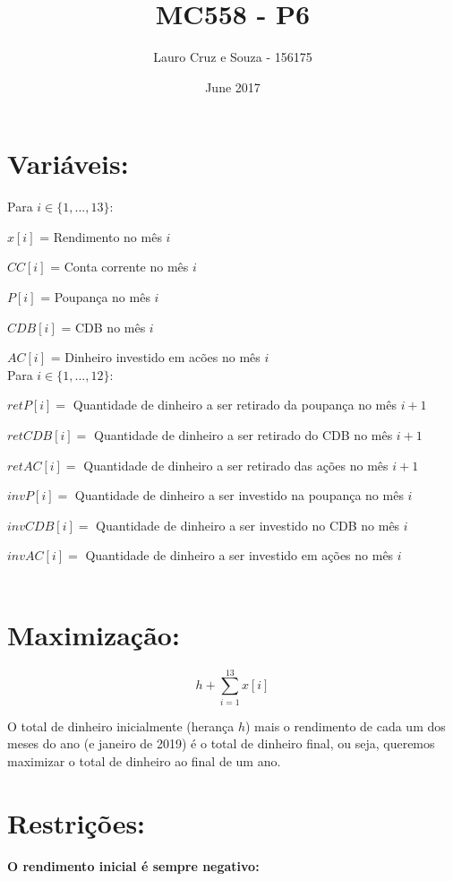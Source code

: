 \documentclass[12pt,a4paper]{article}
\title{MC558 - P6}
\author{Lauro Cruz e Souza - 156175 }
\date{June 2017}
\begin{document}
\maketitle

\section{Variáveis:}

Para $ i \in \{1,...,13\} $:

$ x[i] $ = Rendimento no mês $i$

$ CC[i] $ = Conta corrente no mês $i$

$ P[i] $  = Poupança no mês $i$

$ CDB[i] $ = CDB no mês $i$

$ AC[i] $ = Dinheiro investido em acões no mês $i$\\

Para $ i \in \{1,...,12\} $:

$ retP[i] = $ Quantidade de dinheiro a ser retirado da poupança no mês $i+1$

$ retCDB[i] = $ Quantidade de dinheiro a ser retirado do CDB no mês $i+1$

$ retAC[i] = $ Quantidade de dinheiro a ser retirado das ações no mês $i+1$

$ invP[i] = $ Quantidade de dinheiro a ser investido na poupança no mês $i$

$ invCDB[i] = $ Quantidade de dinheiro a ser investido no CDB no mês $i$

$ invAC[i] = $ Quantidade de dinheiro a ser investido em ações no mês $i$ \\\\

\section{Maximização:}
$$ h + \sum_{i=1}^{13} x[i] $$

O total de dinheiro inicialmente (herança $h$) mais o rendimento de cada um dos meses do ano (e janeiro de 2019) é o total de dinheiro final, ou seja, queremos maximizar o total de dinheiro ao final de um ano.\\

\section{Restrições:}

\textbf{O rendimento inicial é sempre negativo:}
\end{document}
